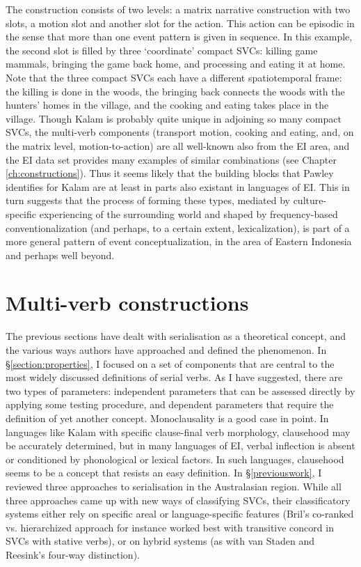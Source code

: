 The construction consists of two levels: a matrix narrative construction with two slots, a motion slot and another slot for the action. This action can be episodic in the sense that more than one event pattern is given in sequence. In this example, the second slot is filled by three `coordinate' compact SVCs: killing game mammals, bringing the game back home, and processing and eating it at home. Note that the three compact SVCs each have a different spatiotemporal frame: the killing is done in the woods, the bringing back connects the woods with the hunters' homes in the village, and the cooking and eating takes place in the village. Though Kalam is probably quite unique in adjoining so many compact SVCs, the multi-verb components (transport motion, cooking and eating, and, on the matrix level, motion-to-action) are all well-known also from the EI area, and the EI data set provides many examples of similar combinations (see Chapter \ref{ch:constructions}). Thus it seems likely that the building blocks that Pawley identifies for Kalam are at least in parts also existant in languages of EI. This in turn suggests that the process of forming these types, mediated by culture-specific experiencing of the surrounding world and shaped by frequency-based conventionalization (and perhaps, to a certain extent, lexicalization), is part of a more general pattern of event conceptualization, in the area of Eastern Indonesia and perhaps well beyond.

\section{Multi-verb constructions} \label{section:multi-verbconstructions}

The previous sections have dealt with serialisation as a theoretical concept, and the various ways authors have approached and defined the phenomenon. In §\ref{section:properties}, I focused on a set of components that are central to the most widely discussed definitions of serial verbs. As I have suggested, there are two types of parameters: independent parameters that can be assessed directly by applying some testing procedure, and dependent parameters that require the definition of yet another concept. Monoclausality is a good case in point. In languages like Kalam with specific clause-final verb morphology, clausehood may be accurately determined, but in many languages of EI, verbal inflection is absent or conditioned by phonological or lexical factors. In such languages, clausehood seems to be a concept that resists an easy definition. In §\ref{previouswork}, I reviewed three approaches to serialisation in the Australasian region. While all three approaches came up with new ways of classifying SVCs, their classificatory systems either rely on specific areal or language-specific features (Bril's co-ranked vs. hierarchized approach for instance worked best with transitive concord in SVCs with stative verbs), or on hybrid systems (as with van Staden and Reesink's four-way distinction).

